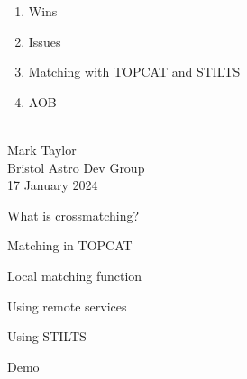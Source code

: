 \documentclass[20pt,landscape]{foils}
\begin{document}
\sf

\newcommand{\bigword}[1]{
  \vspace*{7cm}
  \begin{center}
    \color{darkblue}
    \scalebox{3}{
      \Huge\bf #1
    }
  \end{center}
  \addtocounter{page}{-1}
}

\rightfooter{}
\MyLogo{}

\vspace*{3cm}
\hspace*{5cm}
\begin{minipage}{30cm}
\LARGE
\begin{enumerate}
  \item Wins
  \item Issues
  \item Matching with TOPCAT and STILTS
  \item AOB
\end{enumerate}
\end{minipage}

\newpage
\bigword{Wins?}
\newpage
\bigword{Issues?}
\newpage

\rightfooter{\quad{\color{grey}\thepage/\pageref*{lastPage}}}
\setcounter{page}{1}

\vspace*{1.0cm}
\begin{center}
{\color{darkblue}
}
\\[2.0cm]
{\Large 
  Mark Taylor
}
\\[2.0cm]
{\large\color{grey}
  Bristol Astro Dev Group
  \\[2ex]
  17 January 2024
}
\end{center}

\vspace*{1.5cm}
\begin{center}
  \tiny
  \color{brown}
  
\end{center}


\begin{list1}
  \item What is crossmatching?
  \item Matching in TOPCAT
  \begin{list2big}
    \item Local matching function
    \item Using remote services
  \end{list2big}
  \item Using STILTS
  \item Demo
\end{list1}
\end{document}
